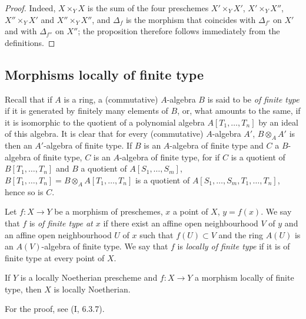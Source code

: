 \begin{proof}
Indeed, $X\times_YX$ is the sum of the four preschemes
$X'\times_YX'$, $X'\times_YX''$, $X''\times_YX'$ and $X''\times_YX''$, and
$\Delta_f$ is the morphism that coincides with $\Delta_{f'}$ on $X'$ and with
$\Delta_{f''}$ on $X''$; the proposition therefore follows immediately from
the definitions.
\end{proof}

\subsection{Morphisms locally of finite type}
\label{subsection:IV.1.3}

\begin{env}[1.3.1]
\label{IV.1.3.1}
Recall that if $A$ is a ring, a (commutative) $A$-algebra $B$ is said to be
\emph{of finite type} if it is generated by finitely many elements of
$B$, or, what amounts to the same, if it is isomorphic to the quotient of a
polynomial algebra $A[T_1,\ldots,T_n]$ by an ideal of this algebra. It is
clear that for every (commutative) $A$-algebra $A'$,
$B\otimes_AA'$ is then an $A'$-algebra of finite type. If $B$ is an
$A$-algebra of finite type and $C$ a $B$-algebra of finite type, $C$ is an
$A$-algebra of finite type, for if $C$ is a quotient of
$B[T_1,\ldots,T_n]$ and $B$ a quotient of $A[S_1,\ldots,S_m]$,
$B[T_1,\ldots,T_n]=B\otimes_AA[T_1,\ldots,T_n]$ is a quotient of
$A[S_1,\ldots,S_m,T_1,\ldots,T_n]$, hence so is $C$.
\end{env}

\begin{definition}[1.3.2]
\label{IV.1.3.2}
Let $f:X\to Y$ be a morphism of preschemes, $x$ a point of $X$,
$y=f(x)$. We say that $f$ is \emph{of finite type at $x$} if there exist an
affine open neighbourhood $V$ of $y$ and an affine open neighbourhood $U$ of
$x$ such that $f(U)\subset V$ and the ring $A(U)$ is an $A(V)$-algebra of
finite type. We say that $f$ is \emph{locally of finite type} if it is of
finite type at every point of $X$.
\end{definition}


\begin{proposition}[1.3.3]
\label{IV.1.3.3}
If $Y$ is a locally Noetherian prescheme and $f:X\to Y$ a morphism
locally of finite type, then $X$ is locally Noetherian.
\end{proposition}

For the proof, see (I, 6.3.7).

